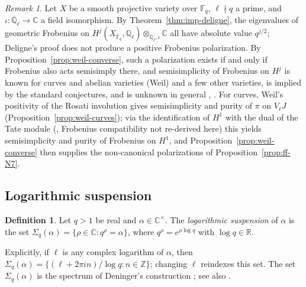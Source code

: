 \documentclass[11pt]{amsart}
\theoremstyle{plain}
\theoremstyle{definition}
\newtheorem{definition}[theorem]{Definition}
\theoremstyle{remark}
\newtheorem{remark}[theorem]{Remark}
\numberwithin{equation}{section}
\newcommand{\C}{\mathbb{C}}
\newcommand{\R}{\mathbb{R}}
\newcommand{\Q}{\mathbb{Q}}
\newcommand{\Z}{\mathbb{Z}}
\newcommand{\F}{\mathbb{F}}
\begin{document}
\begin{remark}\label{rem:ff-status}
Let $X$ be a smooth projective variety over $\F_q$, $\ell\nmid q$ a
prime, and $\iota:\overline{\Q}_\ell\to\C$ a field isomorphism. By
Theorem~\ref{thm:imp-deligne}, the eigenvalues of geometric Frobenius on
$H^j(X_{\overline{\F}_q},\Q_\ell)\otimes_{\Q_\ell,\iota}\C$ all have
absolute value $q^{j/2}$; Deligne's proof does not produce a positive
Frobenius polarization. By Proposition~\ref{prop:weil-converse}, such a
polarization exists if and only if Frobenius also acts semisimply there,
and semisimplicity of Frobenius on $H^j$ is known for curves and abelian
varieties (Weil) and a few other varieties, is implied by the standard
conjectures, and is unknown in general
\cite[p.~10]{Kleiman1994Standard},
\cite[Aside~3.18]{Milne2016RHFF}. For curves,
Weil's positivity of the Rosati involution gives semisimplicity and
purity of $\pi$ on $V_\ell J$ (Proposition~\ref{prop:weil-curves}); via
the identification of $H^1$ with the dual of the Tate module
(\cite[Example~3.8, p.~40]{Milne2016RHFF}, Frobenius compatibility not
re-derived here) this yields semisimplicity and purity of Frobenius on
$H^1$, and Proposition~\ref{prop:weil-converse} then supplies the
non-canonical polarizations of Proposition~\ref{prop:ff-N7}.
\end{remark}

\subsection{Logarithmic suspension}\label{subsec:suspension}

\begin{definition}\label{def:suspension}
Let $q>1$ be real and $\alpha\in\C^\times$. The \emph{logarithmic
suspension} of $\alpha$ is the set
$\Sigma_q(\alpha)=\{\rho\in\C: q^\rho=\alpha\}$, where
$q^\rho=e^{\rho\log q}$ with $\log q\in\R$.
\end{definition}

Explicitly, if $\ell$ is any complex logarithm of $\alpha$, then
$\Sigma_q(\alpha)=\{(\ell+2\pi in)/\log q:n\in\Z\}$; changing $\ell$
reindexes this set. The set $\Sigma_q(\alpha)$ is the spectrum of
Deninger's construction
\cite[Corollary~(2.6), p.~8, and (2.8), p.~10]{Deninger1994Motivic};
see also \cite[Remark~7.2]{Hesselholt2016THHZeta}.
\end{document}

